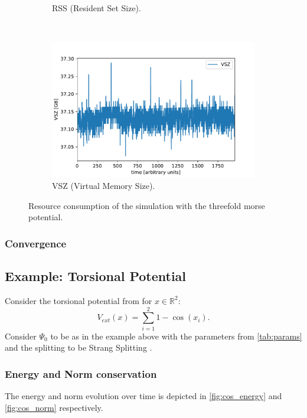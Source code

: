 \documentclass[11pt, a4paper, oneside]{article}
\begin{document}
\begin{figure}[h!]
\begin{subfigure}[b]{0.5 \textwidth}
    \caption{RSS (Resident Set Size).}
  \end{subfigure}
  ~
  \begin{subfigure}[b]{0.5 \textwidth}
    \includegraphics[width = \textwidth]{graphics/threefold_morse/threefold_VSZ.pdf}
    \caption{VSZ (Virtual Memory Size).}
  \end{subfigure}
  \caption{Resource consumption of the simulation with the threefold morse potential.}
  \label{fig:threefold_resource}
\end{figure}

\subsubsection{Convergence}


\subsection{Example: Torsional Potential}
Consider the torsional potential from  for $x \in \mathbb{R}^2$:
\begin{equation*}
  V_{ext}(x) = \sum_{i=1}^2 1 - \cos(x_i).
\end{equation*}
Consider $\Psi_0$ to be as in the example above with the parameters from \cref{tab:params} and the splitting to be Strang Splitting .

\subsubsection{Energy and Norm conservation}
The energy and norm evolution over time is depicted in \cref{fig:cos_energy} and \cref{fig:cos_norm} respectively.
\end{document}
